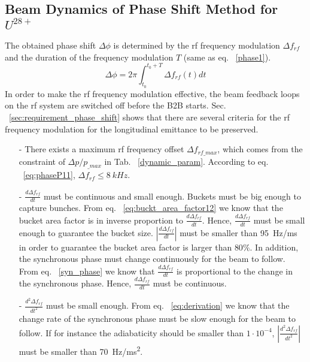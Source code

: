 \subsection{Beam Dynamics of Phase Shift Method for $U^\mathit{28+}$}
The obtained phase shift $\Delta \phi$ is determined by the rf frequency modulation $\Delta f_{rf}$ and the duration of the frequency modulation $T$ (same as eq. ~\ref{phase1}). 
\begin{equation}
\Delta \phi= 2\pi \int_{t_0}^{t_0+T} \Delta f_{rf}(t)dt \label{phase_integration}
\end{equation}
In order to make the rf frequency modulation effective, the beam feedback loops on the rf system are switched off before the B2B starts. Sec. ~\ref{sec:requirement_phase_shift} shows that there are several criteria for the rf frequency modulation for the longitudinal emittance to be preserved.
\begin{itemize}
\item[-]
There exists a maximum rf frequency offset $\Delta f_\mathit{rf\_max}$, which comes from the constraint of $\Delta p/p_\mathit{\_max}$ in Tab. ~\ref{dynamic_param}. According to eq. ~\ref{eq:phaseP11}, $\Delta f_\mathit{rf} \le \SI{8}{kHz}$.
\item[-]
$\frac{d\Delta f_{\mathit{rf}}}{dt}$ must be continuous and small enough. Buckets must be big enough to capture bunches. From eq. ~\ref{eq:buckt_area_factor12} we know that the bucket area factor is in inverse proportion to $\frac{d\Delta f_{\mathit{rf}}}{dt}$. Hence, $\frac{d\Delta f_{\mathit{rf}}}{dt}$ must be small enough to guarantee the bucket size. $|\frac{d\Delta f_{\mathit{rf}}}{dt}|$ must be smaller than \SI{95}{Hz/ms} in order to guarantee the bucket area factor is larger than $80\%$. In addition, the synchronous phase must change continuously for the beam to follow. From eq. ~\ref{syn_phase} we know that $\frac{d\Delta f_{\mathit{rf}}}{dt}$ is proportional to the change in the synchronous phase. Hence, $\frac{d\Delta f_{\mathit{rf}}}{dt}$ must be continuous.
\item[-]
$\frac{d^2\Delta f_{\mathit{rf}}}{dt^2}$ must be small enough. From eq. ~\ref{eq:derivation} we know that the change rate of the synchronous phase must be slow enough for the beam to follow. If for instance the adiabaticity should be smaller than $1\cdot10^{-4}$, $|\frac{d^2\Delta f_{\mathit{rf}}}{dt^2}|$ must be smaller than \SI{70}{Hz/ms^2}.
\end{itemize}


